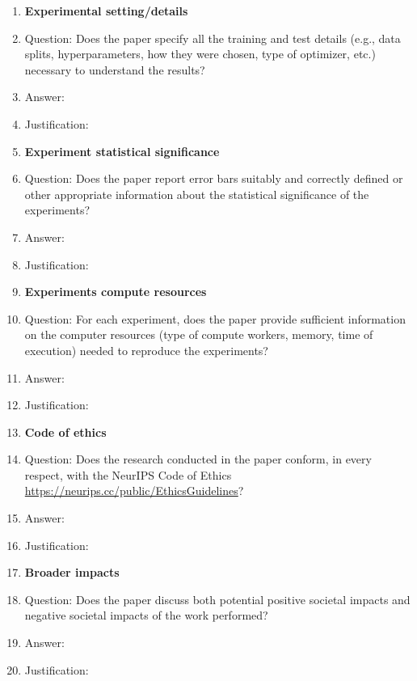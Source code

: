 \documentclass{article}
\begin{document}
\begin{enumerate}
\item {\bf Experimental setting/details}
    \item[] Question: Does the paper specify all the training and test details (e.g., data splits, hyperparameters, how they were chosen, type of optimizer, etc.) necessary to understand the results?
    \item[] Answer: \answerTODO{} %
    \item[] Justification: \justificationTODO{}

\item {\bf Experiment statistical significance}
    \item[] Question: Does the paper report error bars suitably and correctly defined or other appropriate information about the statistical significance of the experiments?
    \item[] Answer: \answerTODO{} %
    \item[] Justification: \justificationTODO{}

\item {\bf Experiments compute resources}
    \item[] Question: For each experiment, does the paper provide sufficient information on the computer resources (type of compute workers, memory, time of execution) needed to reproduce the experiments?
    \item[] Answer: \answerTODO{} %
    \item[] Justification: \justificationTODO{}

\item {\bf Code of ethics}
    \item[] Question: Does the research conducted in the paper conform, in every respect, with the NeurIPS Code of Ethics \url{https://neurips.cc/public/EthicsGuidelines}?
    \item[] Answer: \answerTODO{} %
    \item[] Justification: \justificationTODO{}

\item {\bf Broader impacts}
    \item[] Question: Does the paper discuss both potential positive societal impacts and negative societal impacts of the work performed?
    \item[] Answer: \answerTODO{} %
    \item[] Justification: \justificationTODO{}


\end{enumerate}
\end{document}
